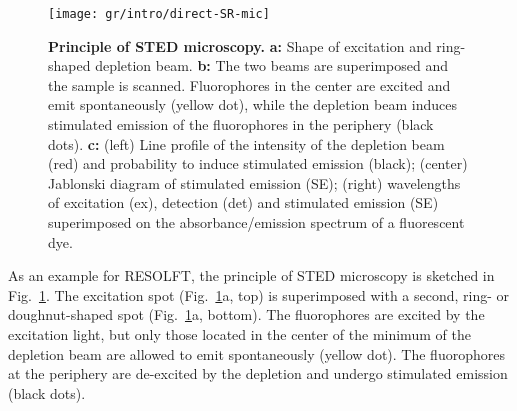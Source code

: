 \begin{figure}
  \centering
  \texttt{[image: gr/intro/direct-SR-mic]}
  \caption{\textbf{Principle of STED microscopy.} \textbf{a:} Shape of
    excitation and ring-shaped depletion beam. \textbf{b:} The two beams are
    superimposed and the sample is scanned. Fluorophores in the center are
    excited and emit spontaneously (yellow dot), while the depletion beam
    induces stimulated emission of the fluorophores in the periphery (black
    dots). \textbf{c:} (left) Line profile of the intensity of the depletion
    beam (red) and probability to induce stimulated emission (black); (center)
    Jablonski diagram of stimulated emission (SE); (right) wavelengths of
    excitation (ex), detection (det) and stimulated emission (SE) superimposed
    on the absorbance/emission spectrum of a fluorescent dye.}
  \label{fig:STED-principle}
\end{figure}

As an example for RESOLFT, the principle of STED microscopy is sketched in
Fig.~\ref{fig:STED-principle}. The excitation spot
(Fig.~\ref{fig:STED-principle}a, top) is superimposed with a second, ring- or
doughnut-shaped spot (Fig.~\ref{fig:STED-principle}a, bottom). The
fluorophores are excited by the excitation light, but only those located in
the center of the minimum of the depletion beam are allowed to emit
spontaneously (yellow dot). The fluorophores at the periphery are de-excited
by the depletion and undergo stimulated emission (black dots).    







